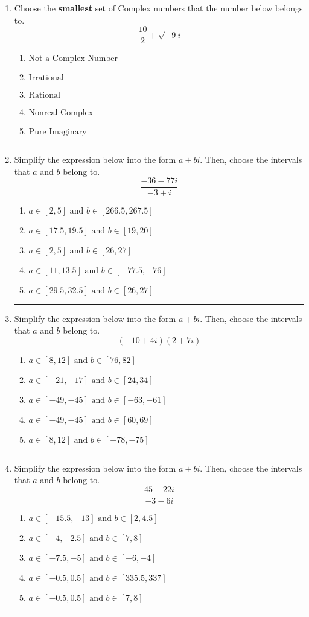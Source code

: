 \documentclass[14pt]{extbook}
\newcommand{\litem}[1]{\item#1\hspace*{-1cm}\rule{\textwidth}{0.4pt}}
\begin{document}
\begin{enumerate}
{\begin{enumerate}[label=\Alph*.]
\end{enumerate} }
\litem{
Choose the \textbf{smallest} set of Complex numbers that the number below belongs to.\[ \frac{10}{2}+\sqrt{-9}i \]\begin{enumerate}[label=\Alph*.]
\item \( \text{Not a Complex Number} \)
\item \( \text{Irrational} \)
\item \( \text{Rational} \)
\item \( \text{Nonreal Complex} \)
\item \( \text{Pure Imaginary} \)

\end{enumerate} }
\litem{
Simplify the expression below into the form $a+bi$. Then, choose the intervals that $a$ and $b$ belong to.\[ \frac{-36 - 77 i}{-3 + i} \]\begin{enumerate}[label=\Alph*.]
\item \( a \in [2, 5] \text{ and } b \in [266.5, 267.5] \)
\item \( a \in [17.5, 19.5] \text{ and } b \in [19, 20] \)
\item \( a \in [2, 5] \text{ and } b \in [26, 27] \)
\item \( a \in [11, 13.5] \text{ and } b \in [-77.5, -76] \)
\item \( a \in [29.5, 32.5] \text{ and } b \in [26, 27] \)

\end{enumerate} }
\litem{
Simplify the expression below into the form $a+bi$. Then, choose the intervals that $a$ and $b$ belong to.\[ (-10 + 4 i)(2 + 7 i) \]\begin{enumerate}[label=\Alph*.]
\item \( a \in [8, 12] \text{ and } b \in [76, 82] \)
\item \( a \in [-21, -17] \text{ and } b \in [24, 34] \)
\item \( a \in [-49, -45] \text{ and } b \in [-63, -61] \)
\item \( a \in [-49, -45] \text{ and } b \in [60, 69] \)
\item \( a \in [8, 12] \text{ and } b \in [-78, -75] \)

\end{enumerate} }
\litem{
Simplify the expression below into the form $a+bi$. Then, choose the intervals that $a$ and $b$ belong to.\[ \frac{45 - 22 i}{-3 - 6 i} \]\begin{enumerate}[label=\Alph*.]
\item \( a \in [-15.5, -13] \text{ and } b \in [2, 4.5] \)
\item \( a \in [-4, -2.5] \text{ and } b \in [7, 8] \)
\item \( a \in [-7.5, -5] \text{ and } b \in [-6, -4] \)
\item \( a \in [-0.5, 0.5] \text{ and } b \in [335.5, 337] \)
\item \( a \in [-0.5, 0.5] \text{ and } b \in [7, 8] \)


\end{enumerate}}
\end{enumerate}
\end{document}
